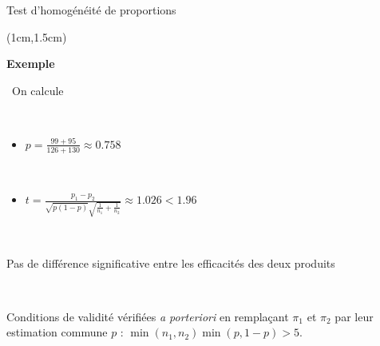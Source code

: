 \documentclass{beamer}
\begin{document}

\begin{frame}{Test d'homogénéité de proportions}
\begin{textblock*}{\textwidth}(1cm,1.5cm)

\begin{center}{\bf \Large Exemple  } \end{center}

 \
On calcule

\
\begin{itemize}
\item $\displaystyle p=\frac{99 + 95}{126 + 130}\approx 0.758$

\
\item $
\displaystyle t=\frac{p_1-p_2}{\sqrt{p(1-p)} \sqrt{\frac{1}{n_1} + \frac{1}{n_2}} } \approx 1.026
<1.96$
\end{itemize}

\

Pas de différence significative entre les efficacités
des deux produits

\

Conditions de validité vérifiées \emph{a porteriori} en remplaçant $\pi_1$ et $\pi_2$ par leur 
estimation commune $p$ : $\min(n_1, n_2) \min(p, 1-p) > 5$.


\end{textblock*}

\end{frame}







\end{document}
